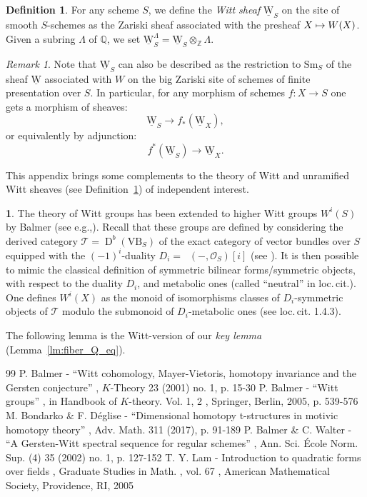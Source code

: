 \documentclass[10pt,a4paper]{amsart}
\def\mto{\mathchoice{\longmapsto}{\mapsto}{\mapsto}{\mapsto}}
\newcommand{\T}{\mathscr T}
\newcommand{\uW}{\underline{\mathrm W}}
\newcommand{\sm}{\mathrm{Sm}}
\DeclareMathOperator{\uHom}{\underline{Hom}}
\DeclareMathOperator{\Der}{D}
\newcommand{\ZZ} {\mathbb Z}
\newcommand{\QQ} {\mathbb Q}
\theoremstyle{remark}
\newtheorem{rem}[thm]{Remark}
\theoremstyle{definition}
\newtheorem{df}[thm]{Definition}
\newtheorem{num}[thm]{}
\numberwithin{equation}{thm}
\newcommand{\eg}{e.g.,\xspace}
\begin{document}
\begin{df}\label{df:unramified_Witt}
For any scheme $S$, we define the \emph{Witt sheaf} $\uW_S$ on the site of smooth $S$-schemes as the Zariski sheaf associated with the presheaf $X \mto W(X)$.
Given a subring $\Lambda$ of $\QQ$, we set $\uW_S^\Lambda=\uW_S \otimes_\ZZ \Lambda$.
\end{df}

\begin{rem}
Note that $\uW_S$ can also be described as the restriction to $\sm_S$ of the sheaf $\uW$ associated with $W$ on the big Zariski site of schemes of finite presentation over $S$.
In particular, for any morphism of schemes $f:X \to S$ one gets a morphism of sheaves:
\begin{equation}\label{eq:funct1_uW}
\uW_S \to f_*(\uW_X),
\end{equation}
or equivalently by adjunction:
\begin{equation}\label{eq:funct2_uW}
f^*(\uW_S) \to \uW_X.
\end{equation}
\end{rem}

This appendix brings some complements to the theory of Witt and unramified Witt sheaves
(see Definition~\ref{df:unramified_Witt}) of independent interest.

\begin{num}\label{num:Balmer}
The theory of Witt groups has been extended to
higher Witt groups $W^i(S)$ by Balmer (see \eg \cite{BalmerBasic}).
Recall that these groups are defined by considering the deri\-ved category
$\T=\Der^b(\mathrm{VB}_S)$ of the exact category of vector bundles over $S$
equipped with the $(-1)^i$-duality $D_i=\uHom(-,\mathcal O_S)[i]$
(see \cite[1.4.12]{BalmerBasic}).
It is then possible to mimic the classical definition of
symmetric bilinear forms/symmetric objects, with respect to the duality $D_i$, and metabolic ones (called ``neutral'' in loc.\,cit.).
One defines $W^i(X)$ as the monoid of isomorphisms classes of
$D_i$-symmetric objects of $\T$ modulo the submonoid of $D_i$-metabolic ones (see loc.\,cit. 1.4.3).

The following lemma is the Witt-version of our \emph{key lemma} (Lemma~\ref{lm:fiber_Q_eq}).
\end{num}

\begin{thebibliography}{99}
 P. Balmer - “Witt cohomology, Mayer-Vietoris, homotopy invariance and the Gersten conjecture” , $K$-Theory 23 (2001) no. 1, p. 15-30
 P. Balmer - “Witt groups” , in Handbook of $K$-theory. Vol. 1, 2 , Springer, Berlin, 2005, p. 539-576
 M. Bondarko \& F. Déglise - “Dimensional homotopy t-structures in motivic homotopy theory” , Adv. Math. 311 (2017), p. 91-189
 P. Balmer \& C. Walter - “A Gersten-Witt spectral sequence for regular schemes” , Ann. Sci. École Norm. Sup. (4) 35 (2002) no. 1, p. 127-152
 T. Y. Lam - Introduction to quadratic forms over fields , Graduate Studies in Math. , vol. 67 , American Mathematical Society, Providence, RI, 2005
\end{thebibliography}
\end{document}
